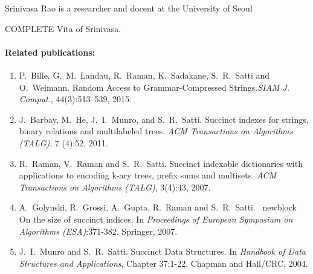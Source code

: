 \documentclass[a4paper,10pt]{article}
\begin{document}
Srinivasa Rao  is a researcher and docent at the University of Seoul
\begin{TODO}
COMPLETE Vita of Srinivasa.
\end{TODO}

\paragraph{Related publications:}
\begin{enumerate}
\item P.~Bille, G.~M.~Landau, R.~Raman, K.~Sadakane, S.~R.~Satti and O.~Weimann. \newblock Random Access to Grammar-Compressed Strings.\newblock \emph{{SIAM} J. Comput.}, 44(3):513--539, 2015.
\item J.~Barbay, M.~He, J.~I.~Munro, and S.~R.~Satti. \newblock Succinct indexes for strings, binary relations and multilabeled trees. \newblock \emph{ACM Transactions on Algorithms (TALG)}, 7 (4):52, 2011.
\item R.~Raman, V.~Raman and S.~R.~Satti. \newblock Succinct indexable dictionaries with applications to encoding k-ary trees, prefix sums and multisets. \newblock \emph{ACM Transactions on Algorithms (TALG)}, 3(4):43, 2007.
\item A.~Golynski, R.~Grossi, A.~Gupta, R.~Raman and S.~R.~Satti. \ newblock On the size of succinct indices. \newblock In \emph {Proceedings of European Symposium on Algorithms (ESA)}:371-382.  Springer, 2007.
\item J.~I.~Munro and S.~R.~Satti. \newblock Succinct Data Structures. \newblock In \emph{Handbook of Data Structures and Applications}, Chapter 37:1-22. {Chapman and Hall/CRC}, 2004.
\end{enumerate}


\newpage



\end{document}
